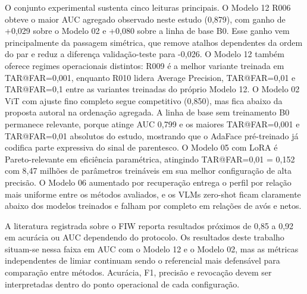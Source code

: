 O conjunto experimental sustenta cinco leituras principais. O Modelo 12 R006 obteve o maior AUC agregado observado neste estudo (0,879), com ganho de +0,029 sobre o Modelo 02 e +0,080 sobre a linha de base B0. Esse ganho vem principalmente da passagem simétrica, que remove atalhos dependentes da ordem do par e reduz a diferença validação-teste para -0,026. O Modelo 12 também oferece regimes operacionais distintos: R009 é a melhor variante treinada em TAR@FAR=0,001, enquanto R010 lidera Average Precision, TAR@FAR=0,01 e TAR@FAR=0,1 entre as variantes treinadas do próprio Modelo 12. O Modelo 02 ViT com ajuste fino completo segue competitivo (0,850), mas fica abaixo da proposta autoral na ordenação agregada. A linha de base sem treinamento B0 permanece relevante, porque atinge AUC 0,799 e os maiores TAR@FAR=0,001 e TAR@FAR=0,01 absolutos do estudo, mostrando que o AdaFace pré-treinado já codifica parte expressiva do sinal de parentesco. O Modelo 05 com LoRA é Pareto-relevante em eficiência paramétrica, atingindo TAR@FAR=0,01 = 0,152 com 8,47 milhões de parâmetros treináveis em sua melhor configuração de alta precisão. O Modelo 06 aumentado por recuperação entrega o perfil por relação mais uniforme entre os métodos avaliados, e os VLMs zero-shot ficam claramente abaixo dos modelos treinados e falham por completo em relações de avós e netos.

A literatura registrada sobre o FIW reporta resultados próximos de 0,85 a 0,92 em acurácia ou AUC dependendo do protocolo. Os resultados deste trabalho situam-se nessa faixa em AUC com o Modelo 12 e o Modelo 02, mas as métricas independentes de limiar continuam sendo o referencial mais defensável para comparação entre métodos. Acurácia, F1, precisão e revocação devem ser interpretadas dentro do ponto operacional de cada configuração.
